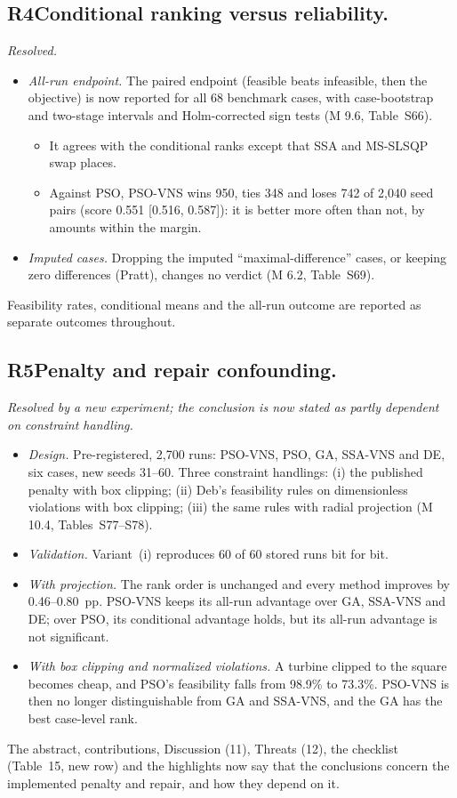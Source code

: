 \documentclass[11pt,a4paper]{article}
\newcommand{\concern}[2]{\subsection*{#1\quad #2}}
\begin{document}
\concern{R4}{Conditional ranking versus reliability.}
\emph{Resolved.}
\begin{itemize}
\item \emph{All-run endpoint.} The paired endpoint (feasible beats infeasible, then the objective) is now reported for
all 68 benchmark cases, with case-bootstrap and two-stage intervals and Holm-corrected sign tests (M 9.6, Table~S66).
\begin{itemize}
\item It agrees with the conditional ranks except that SSA and MS-SLSQP swap places.
\item Against PSO, PSO-VNS wins 950, ties 348 and loses 742 of 2,040 seed pairs (score 0.551 [0.516, 0.587]): it is
better more often than not, by amounts within the margin.
\end{itemize}
\item \emph{Imputed cases.} Dropping the imputed ``maximal-difference'' cases, or keeping zero differences (Pratt),
changes no verdict (M 6.2, Table~S69).
\end{itemize}
Feasibility rates, conditional means and the all-run outcome are reported as separate outcomes throughout.

\concern{R5}{Penalty and repair confounding.}
\emph{Resolved by a new experiment; the conclusion is now stated as partly dependent on constraint handling.}
\begin{itemize}
\item \emph{Design.} Pre-registered, 2,700 runs: PSO-VNS, PSO, GA, SSA-VNS and DE, six cases, new seeds 31--60.
Three constraint handlings: (i) the published penalty with box clipping; (ii) Deb's feasibility rules on
dimensionless violations with box clipping; (iii) the same rules with radial projection (M 10.4, Tables~S77--S78).
\item \emph{Validation.} Variant~(i) reproduces 60 of 60 stored runs bit for bit.
\item \emph{With projection.} The rank order is unchanged and every method improves by 0.46--0.80~pp. PSO-VNS keeps
its all-run advantage over GA, SSA-VNS and DE; over PSO, its conditional advantage holds, but its all-run advantage
is not significant.
\item \emph{With box clipping and normalized violations.} A turbine clipped to the square becomes cheap, and PSO's
feasibility falls from 98.9\% to 73.3\%. PSO-VNS is then no longer distinguishable from GA and SSA-VNS, and the GA
has the best case-level rank.
\end{itemize}
The abstract, contributions, Discussion (11), Threats (12), the checklist (Table~15, new row) and the highlights
now say that the conclusions concern the implemented penalty and repair, and how they depend on it.
\end{document}
